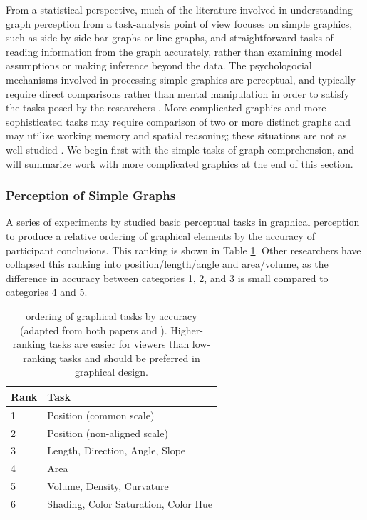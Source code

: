 \documentclass[11pt]{isuthesis}\usepackage[]{graphicx}\usepackage[]{color}
\begin{document}
From a statistical perspective, much of the literature involved in understanding graph perception from a task-analysis point of view focuses on simple graphics, such as side-by-side bar graphs or line graphs, and straightforward tasks of reading information from the graph accurately, rather than examining model assumptions or making inference beyond the data. The psychologocial mechanisms involved in processing simple graphics are perceptual, and typically require direct comparisons rather than mental manipulation in order to satisfy the tasks posed by the researchers \citep{trickett2006toward}. More complicated graphics and more sophisticated tasks may require comparison of two or more distinct graphs and may utilize working memory and spatial reasoning; these situations are not as well studied \citep{shah2005cambridge}. We begin first with the simple tasks of graph comprehension, and will summarize work with more complicated graphics at the end of this section. 

\subsubsection{Perception of Simple Graphs}
A series of experiments by \citet{cleveland:1984, cleveland:1985} studied basic perceptual tasks in graphical perception to produce a relative ordering of graphical elements by the accuracy of participant conclusions. This ranking is shown in Table \ref{clevelandranking}. Other researchers \citep{kosslyn1994} have collapsed this ranking into position/length/angle and area/volume, as the difference in accuracy between categories 1, 2, and 3 is small compared to categories 4 and 5. 
\begin{table}[htbp]\centering

\caption[Cleveland \& McGill's ordering of graphical tasks]{\protect\citet{cleveland:1984, cleveland:1985} ordering of graphical tasks by accuracy (adapted from both papers and \protect\citealt{shah2005cambridge}). Higher-ranking tasks are easier for viewers than low-ranking tasks and should be preferred in graphical design.}\label{clevelandranking}
\begin{tabular}{ll}
\hline
Rank & Task\\\hline
1 & Position (common scale)\\
2 & Position (non-aligned scale)\\
3 & Length, Direction, Angle, Slope\\
4 & Area \\
5 & Volume, Density, Curvature\\
6 & Shading, Color Saturation, Color Hue\\\hline
\end{tabular}
\end{table}
\end{document}

